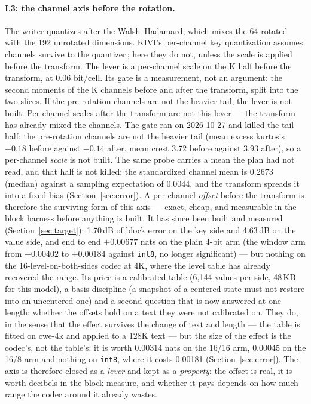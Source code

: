 \documentclass[10pt,twocolumn]{article}
\begin{document}
\paragraph{L3: the channel axis before the rotation.} The writer quantizes after the Walsh--Hadamard, which mixes the 64 rotated with the 192 unrotated dimensions. KIVI's per-channel key quantization assumes channels survive to the quantizer\,\cite{kivi}; here they do not, unless the scale is applied before the transform. The lever is a per-channel scale on the K half before the transform, at 0.06 bit/cell. Its gate is a measurement, not an argument: the second moments of the K channels before and after the transform, split into the two slices. If the pre-rotation channels are not the heavier tail, the lever is not built. Per-channel scales after the transform are not this lever --- the transform has already mixed the channels. The gate ran on 2026-10-27 and killed the tail half: the pre-rotation channels are not the heavier tail (mean excess kurtosis $-0.18$ before against $-0.14$ after, mean crest 3.72 before against 3.93 after), so a per-channel \emph{scale} is not built. The same probe carries a mean the plan had not read, and that half is not killed: the standardized channel mean is 0.2673 (median) against a sampling expectation of 0.0044, and the transform spreads it into a fixed bias (Section~\ref{sec:error}). A per-channel \emph{offset} before the transform is therefore the surviving form of this axis --- exact, cheap, and measurable in the block harness before anything is built. It has since been built and measured (Section~\ref{sec:target}): 1.70\,dB of block error on the key side and 4.63\,dB on the value side, and end to end $+0.00677$ nats on the plain 4-bit arm (the window arm from $+0.00402$ to $+0.00184$ against \texttt{int8}, no longer significant) --- but nothing on the 16-level-on-both-sides codec at 4K, where the level table has already recovered the range. Its price is a calibrated table (6,144 values per side, 48\,KB for this model), a basis discipline (a snapshot of a centered state must not restore into an uncentered one) and a second question that is now answered at one length: whether the offsets hold on a text they were not calibrated on. They do, in the sense that the effect survives the change of text and length --- the table is fitted on cwe-4k and applied to a 128K text --- but the size of the effect is the codec's, not the table's: it is worth 0.00314 nats on the 16/16 arm, 0.00045 on the 16/8 arm and nothing on \texttt{int8}, where it costs 0.00181 (Section~\ref{sec:error}). The axis is therefore closed as a \emph{lever} and kept as a \emph{property}: the offset is real, it is worth decibels in the block measure, and whether it pays depends on how much range the codec around it already wastes.
\end{document}
